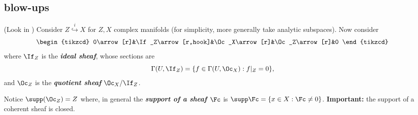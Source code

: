 \subsection{blow-ups}
(Look in \cite{hartshorne}) Consider $Z\overset{i}{\hookrightarrow}X$ for $Z,X$ complex manifolds (for simplicity, more generally take analytic subspaces). Now consider
\[\begin{tikzcd}
	0\arrow[r]&\If_Z\arrow[r,hook]&\Oc_X\arrow[r]&\Oc_Z\arrow[r]&0
\end{tikzcd}\]
where $\If_Z$ is the \textbf{\textit{ideal sheaf}}, whose sections are
\[\Gamma(U,\If_Z)=\{f\in\Gamma(U,\Oc_X):f|_Z=0\},\]
and $\Oc_Z$ is the \textbf{\textit{quotient sheaf}} $\Oc_X/\If_Z$.

Notice $\supp(\Oc_Z)=Z$ where, in general the \textbf{\textit{support of a sheaf $\Fc$}} is $\supp\Fc=\{x\in X:\Fc\neq0\}$. \textbf{Important:} the support of a coherent sheaf is closed.

